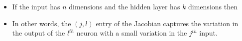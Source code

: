 \begin{frame}
  \begin{columns}
    \begin{overlayarea}{\textwidth}{\textheight}
        \begin{itemize}\justifying
            \item<1-> If the input has $n$ dimensions and the hidden layer has $k$ dimensions then
            \item<3-> In other words, the $(j,l)$ entry of the Jacobian captures the variation in the output of the $l^{th}$ neuron with a small variation in the $j^{th}$ input.
        \end{itemize}
    \end{overlayarea}

    \begin{overlayarea}{\textwidth}{\textheight}
    \end{overlayarea}
  \end{columns}
\end{frame}


